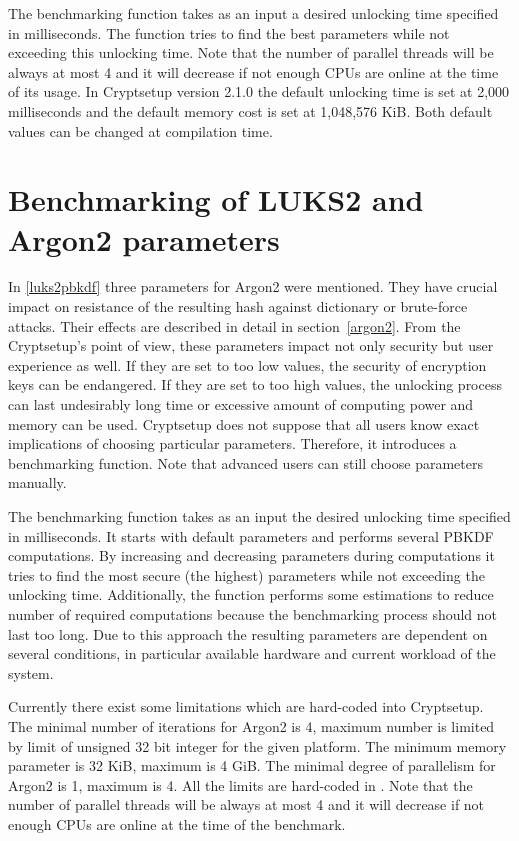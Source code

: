 \documentclass[nolof,digital]{fithesis3}
\begin{document}
The benchmarking function takes as an input a desired unlocking time specified in milliseconds. The function tries to find the best parameters while not exceeding this unlocking time. Note that the number of parallel threads will be always at most 4 and it will decrease if not enough CPUs are online at the time of its usage. In Cryptsetup version 2.1.0 the default unlocking time is set at 2,000 milliseconds and the default memory cost is set at 1,048,576 KiB. Both default values can be changed at compilation time.

\section{Benchmarking of LUKS2 and Argon2 parameters}
\label{sec:benchmark}
In \ref{luks2pbkdf} three parameters for Argon2 were mentioned. They have crucial impact on resistance of the resulting hash against dictionary or brute-force attacks. Their effects are described in detail in section~\ref{argon2}. From the Cryptsetup's point of view, these parameters impact not only security but user experience as well. If they are set to too low values, the security of encryption keys can be endangered. If they are set to too high values, the unlocking process can last undesirably long time or excessive amount of computing power and memory can be used. Cryptsetup does not suppose that all users know exact implications of choosing particular parameters. Therefore, it introduces a benchmarking function. Note that advanced users can still choose parameters manually.

The benchmarking function takes as an input the desired unlocking time specified in milliseconds. It starts with default parameters and performs several PBKDF computations. By increasing and decreasing parameters during computations it tries to find the most secure (the highest) parameters while not exceeding the unlocking time. Additionally, the function performs some estimations to reduce number of required computations because the benchmarking process should not last too long. Due to this approach the resulting parameters are dependent on several conditions, in particular available hardware and current workload of the system.

Currently there exist some limitations which are hard-coded into Cryptsetup. The minimal number of iterations for Argon2 is 4, maximum number is limited by limit of unsigned 32 bit integer for the given platform. The minimum memory parameter is 32 KiB, maximum is 4 GiB. The minimal degree of parallelism for Argon2 is 1, maximum is 4. All the limits are hard-coded in \parencite{cryptsetupgitpbkdfcheck}. Note that the number of parallel threads will be always at most 4 and it will decrease if not enough CPUs are online at the time of the benchmark.
\end{document}
